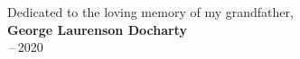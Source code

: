 
\thispagestyle{empty}


\vspace*{3cm}

\begin{center}
\end{center}

\medskip

\begin{center}

Dedicated to the loving memory of my grandfather,\\ \textbf{George Laurenson Docharty} \\ \,--\,2020
\end{center}
